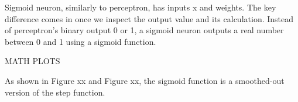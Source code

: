 Sigmoid neuron, similarly to perceptron, has inputs x and weights. The key difference comes in once we inspect the output value and its calculation. Instead of perceptron's binary output 0 or 1, a sigmoid neuron outputs a real number between 0 and 1 using a sigmoid function.\cite{nndl2015michaelnielsen}\cite{rojas2013neural}

MATH
PLOTS

As shown in Figure xx and Figure xx, the sigmoid function is a smoothed-out version of the step function.